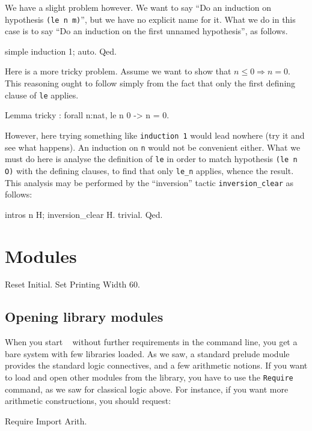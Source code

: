 \documentclass[11pt,a4paper]{book}
\begin{document}
We have a slight problem however. We want to say ``Do an induction on
hypothesis \verb:(le n m):'', but we have no explicit name for it. What we
do in this case is to say ``Do an induction on the first unnamed hypothesis'',
as follows.
\begin{coq_example}
simple induction 1; auto.
Qed.
\end{coq_example}

Here is a more tricky problem. Assume we want to show that
$n\le 0 \Rightarrow n=0$. This reasoning ought to follow simply from the
fact that only the first defining clause of \verb:le: applies.
\begin{coq_example} 
Lemma tricky : forall n:nat, le n 0 -> n = 0.
\end{coq_example}

However, here trying something like \verb:induction 1: would lead
nowhere (try it and see what happens). 
An induction on \verb:n: would not be convenient either.
What we must do here is analyse the definition of \verb"le" in order
to match hypothesis \verb:(le n O): with the defining clauses, to find
that only \verb:le_n: applies, whence the result. 
This analysis may be performed by the ``inversion'' tactic
\verb:inversion_clear: as follows:
\begin{coq_example} 
intros n H; inversion_clear H.
trivial.
Qed.
\end{coq_example}

\chapter{Modules}

\begin{coq_eval}
Reset Initial.
Set Printing Width 60.
\end{coq_eval}

\section{Opening library modules}

When you start \Coq~ without further requirements in the command line,
you get a bare system with few libraries loaded.  As we saw, a standard
prelude module provides the standard logic connectives, and a few
arithmetic notions. If you want to load and open other modules from
the library, you have to use the \verb"Require" command, as we saw for
classical logic above. For instance, if you want more arithmetic
constructions, you should request:
\begin{coq_example*}
Require Import Arith.
\end{coq_example*}
\end{document}
